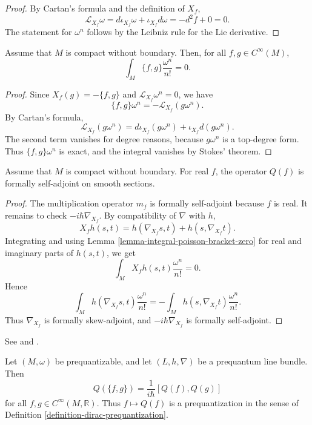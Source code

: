 \begin{proof}
By Cartan's formula and the definition of
$X_f$,
$$
\mathcal L_{X_f}\omega
=d\iota_{X_f}\omega+
\iota_{X_f}d\omega
=-d^2f+0=0.
$$
The statement for $\omega^n$ follows by the
Leibniz rule for the Lie derivative.
\end{proof}

\begin{lemma}
\label{lemma-integral-poisson-bracket-zero}
Assume that $M$ is compact without boundary.
Then, for all $f,g\in C^{\infty}(M)$,
$$
\int_M \{f,g\}\frac{\omega^n}{n!}=0.
$$
\end{lemma}

\begin{proof}
Since $X_f(g)=-\{f,g\}$ and
$\mathcal L_{X_f}\omega^n=0$, we have
$$
\{f,g\}\omega^n
=-\mathcal L_{X_f}(g\omega^n).
$$
By Cartan's formula,
$$
\mathcal L_{X_f}(g\omega^n)
=d\iota_{X_f}(g\omega^n)+
\iota_{X_f}d(g\omega^n).
$$
The second term vanishes for degree reasons,
because $g\omega^n$ is a top-degree form.
Thus $\{f,g\}\omega^n$ is exact, and the
integral vanishes by Stokes' theorem.
\end{proof}

\begin{proposition}
\label{proposition-prequantum-self-adjoint}
Assume that $M$ is compact without boundary.
For real $f$, the operator $Q(f)$ is formally
self-adjoint on smooth sections.
\end{proposition}

\begin{proof}
The multiplication operator $m_f$ is formally
self-adjoint because $f$ is real.  It remains
to check $-i\hbar\nabla_{X_f}$.
By compatibility of $\nabla$ with $h$,
$$
X_fh(s,t)=h(\nabla_{X_f}s,t)
+h(s,\nabla_{X_f}t).
$$
Integrating and using Lemma
\ref{lemma-integral-poisson-bracket-zero} for
real and imaginary parts of $h(s,t)$, we get
$$
\int_M X_fh(s,t)\frac{\omega^n}{n!}=0.
$$
Hence
$$
\int_M h(\nabla_{X_f}s,t)\frac{\omega^n}{n!}
=-
\int_M h(s,\nabla_{X_f}t)\frac{\omega^n}{n!}.
$$
Thus $\nabla_{X_f}$ is formally skew-adjoint,
and $-i\hbar\nabla_{X_f}$ is formally
self-adjoint.
\end{proof}

\begin{theorem}
\label{theorem-kostant-souriau}
\begin{reference}
See \cite[Lecture 12]{wang} and
\cite[Chapter 23]{hallq}.
\end{reference}
Let $(M,\omega)$ be prequantizable, and let
$(L,h,\nabla)$ be a prequantum line bundle.
Then
$$
Q(\{f,g\})=\frac{1}{i\hbar}[Q(f),Q(g)]
$$
for all $f,g\in C^{\infty}(M,\mathbb R)$.
Thus $f\mapsto Q(f)$ is a prequantization in
the sense of Definition
\ref{definition-dirac-prequantization}.
\end{theorem}

